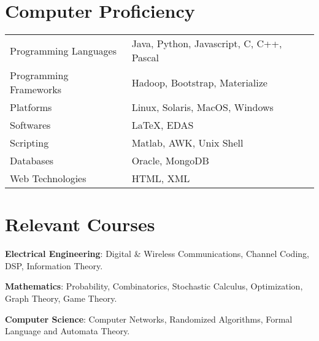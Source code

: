 \documentclass[10pt]{article}
\begin{document}
%
 
\section*{Computer Proficiency}
\begin{tabular}{l l}
Programming Languages & Java, Python, Javascript, C, C++, Pascal\\
Programming Frameworks & Hadoop, Bootstrap, Materialize\\
Platforms & {\sc Linux}, {Solaris}, MacOS, Windows\\
Softwares & {\LaTeX}, EDAS\\
Scripting & {\sc Matlab}, AWK, Unix Shell\\
Databases & Oracle, MongoDB\\
Web Technologies & HTML, XML
\end{tabular}

\section*{Relevant Courses}
\begin{shortlist}
\item \textbf{Electrical Engineering}: 
Digital \& Wireless Communications, Channel Coding, DSP, Information Theory.
\item \textbf{Mathematics}: 
Probability, Combinatorics, Stochastic Calculus, Optimization, Graph Theory, Game Theory.
\item \textbf{Computer Science}: 
Computer Networks, Randomized Algorithms, Formal Language and Automata Theory.
\end{shortlist}
\end{document}
